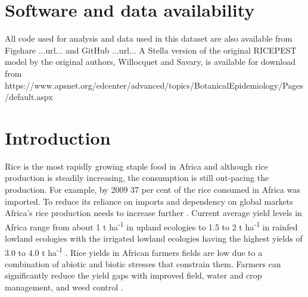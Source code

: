 \documentclass[preprint,review,12pt]{elsarticle}
\begin{document}
    
    
    \linenumbers
    
    \section{Software and data availability}
    All code used for analysis and data used in this dataset are also available from Figshare ...url... and GitHub ...url... A Stella version of the original RICEPEST model by the original authors, Willocquet and Savary, is available for download from\\ {\scriptsize https://www.apsnet.org/edcenter/advanced/topics/BotanicalEpidemiology/Pages/default.aspx}
    
    
    \section{Introduction}
    Rice is the most rapidly growing staple food in Africa and although rice production is steadily increasing, the consumption is still out-pacing the production. For example, by 2009 37 per cent of the rice consumed in Africa was imported. To reduce its reliance on imports and dependency on global markets Africa's rice production needs to increase further \cite{Seck2013}. Current average yield levels in Africa range from about 1 t ha\textsuperscript{-1} in upland ecologies to 1.5 to 2 t ha\textsuperscript{-1} in rainfed lowland ecologies with the irrigated lowland ecologies having the highest yields of 3.0 to 4.0 t ha\textsuperscript{-1} \cite{Diagne2013}. Rice yields in African farmers fields are low due to a combination of abiotic and biotic stresses that constrain them. Farmers can significantly reduce the yield gaps with improved field, water and crop management, and weed control \cite{Saito2013}.
    
\end{document}
